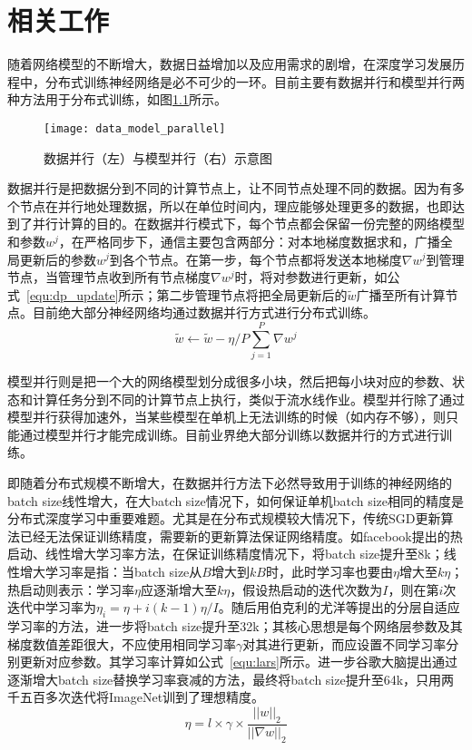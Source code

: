\chapter{相关工作}
随着网络模型的不断增大，数据日益增加以及应用需求的剧增，在深度学习发展历程中，分布式训练神经网络是必不可少的一环。目前主要有数据并行和模型并行两种方法用于分布式训练，如图\ref{fig:data_model_parallel}所示。

\begin{figure}[htp]
\centering
\texttt{[image: data\_model\_parallel]}
\caption{数据并行（左）与模型并行（右）示意图}
\label{fig:data_model_parallel}
\end{figure}
数据并行是把数据分到不同的计算节点上，让不同节点处理不同的数据。因为有多个节点在并行地处理数据，所以在单位时间内，理应能够处理更多的数据，也即达到了并行计算的目的。在数据并行模式下，每个节点都会保留一份完整的网络模型和参数$w^{j}$，在严格同步下，通信主要包含两部分：对本地梯度数据求和，广播全局更新后的参数$w^{j}$到各个节点。在第一步，每个节点都将发送本地梯度$\nabla w^{j}$到管理节点，当管理节点收到所有节点梯度$\nabla w^{j}$时，将对参数进行更新，如公式~\ref{equ:dp_update}所示；第二步管理节点将把全局更新后的$\widetilde w$广播至所有计算节点。目前绝大部分神经网络均通过数据并行方式进行分布式训练。
\begin{equation}
\label{equ:dp_update}
\widetilde w \leftarrow \widetilde w - \eta /P \sum^{P}_{j=1}\nabla w^{j}
\end{equation}


模型并行则是把一个大的网络模型划分成很多小块，然后把每小块对应的参数、状态和计算任务分到不同的计算节点上执行，类似于流水线作业。模型并行除了通过模型并行获得加速外，当某些模型在单机上无法训练的时候（如内存不够），则只能通过模型并行才能完成训练。目前业界绝大部分训练以数据并行的方式进行训练。

即随着分布式规模不断增大，在数据并行方法下必然导致用于训练的神经网络的batch size线性增大，在大batch size情况下，如何保证单机batch size相同的精度是分布式深度学习中重要难题。尤其是在分布式规模较大情况下，传统SGD更新算法已经无法保证训练精度，需要新的更新算法保证网络精度。如facebook提出的热启动、线性增大学习率方法，在保证训练精度情况下，将batch size提升至8k；线性增大学习率是指：当batch size从$B$增大到$kB$时，此时学习率也要由$\eta$增大至$k\eta$；热启动则表示：学习率$\eta$应逐渐增大至$k\eta$，假设热启动的迭代次数为$I$，则在第$i$次迭代中学习率为$\eta _{i}=\eta + i(k-1)\eta/I$。随后用伯克利的尤洋等提出的分层自适应学习率的方法，进一步将batch size提升至32k；其核心思想是每个网络层参数及其梯度数值差距很大，不应使用相同学习率$\gamma$对其进行更新，而应设置不同学习率分别更新对应参数。其学习率计算如公式~\ref{equ:lars}所示。进一步谷歌大脑提出通过逐渐增大batch size替换学习率衰减的方法，最终将batch size提升至64k，只用两千五百多次迭代将ImageNet训到了理想精度。
\begin{equation}
\eta = l \times \gamma \times \frac{||w||_{2}}{||\nabla w||_{2}}
\label{equ:lars}
\end{equation}

